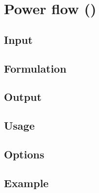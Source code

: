 \chapter{Power flow (\pflow)}\label{chap:pflow}
\todo
\section{Input}
\section{Formulation}
\section{Output}
\section{Usage}
\section{Options}
\section{Example}
